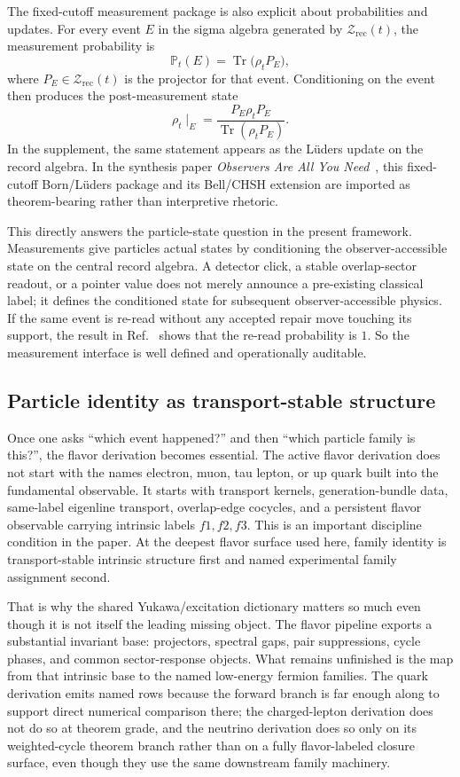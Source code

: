 \documentclass[11pt]{article}
\begin{document}
The fixed-cutoff measurement package is also explicit about probabilities and updates. For every
event \(E\) in the sigma algebra generated by \(\mathcal Z_{\mathrm{rec}}(t)\), the measurement
probability is
\[
\mathbb P_t(E)=\operatorname{Tr}\!\bigl(\rho_t P_E\bigr),
\]
where \(P_E\in\mathcal Z_{\mathrm{rec}}(t)\) is the projector for that event. Conditioning on the
event then produces the post-measurement state
\[
\rho_t\!\mid_E
=
\frac{P_E\rho_t P_E}{\operatorname{Tr}(\rho_t P_E)}.
\]
In the supplement, the same statement appears as the L\"uders update on the record algebra. In
the synthesis paper \emph{Observers Are All You Need}~\cite{ophsynthesis}, this fixed-cutoff
Born/L\"uders package and its Bell/CHSH extension are imported as theorem-bearing rather than
interpretive rhetoric.

This directly answers the particle-state question in the present framework. Measurements give particles
actual states by conditioning the observer-accessible state on the central record algebra. A
detector click, a stable overlap-sector readout, or a pointer value does not merely announce a
pre-existing classical label; it defines the conditioned state for subsequent observer-accessible
physics. If the same event is re-read without any accepted repair move touching its support, the
result in Ref.~\cite{ophmicrophysics} shows that the re-read probability is \(1\). So the measurement interface is
well defined and operationally auditable.

\subsection{Particle identity as transport-stable structure}

Once one asks ``which event happened?'' and then ``which particle family is this?'', the
flavor derivation becomes essential. The active flavor derivation does not start with the
names electron, muon, tau lepton, or up quark built into the fundamental observable. It starts
with transport kernels, generation-bundle data, same-label eigenline transport, overlap-edge
cocycles, and a persistent flavor observable carrying intrinsic labels \(f1,f2,f3\). This is an
important discipline condition in the paper. At the deepest flavor surface used here, family
identity is transport-stable intrinsic structure first and named experimental family assignment
second.

That is why the shared Yukawa/excitation dictionary matters so much even though it is not
itself the leading missing object. The flavor pipeline exports a substantial invariant base:
projectors, spectral gaps, pair suppressions, cycle phases, and common sector-response objects.
What remains unfinished is the map from that intrinsic base to the named low-energy fermion
families. The quark derivation emits named rows because the forward branch is far enough along to
support direct numerical comparison there; the charged-lepton derivation does not do so at theorem
grade, and the neutrino derivation does so only on its weighted-cycle theorem branch rather than
on a fully flavor-labeled closure surface, even though they use the same downstream family machinery.
\end{document}

